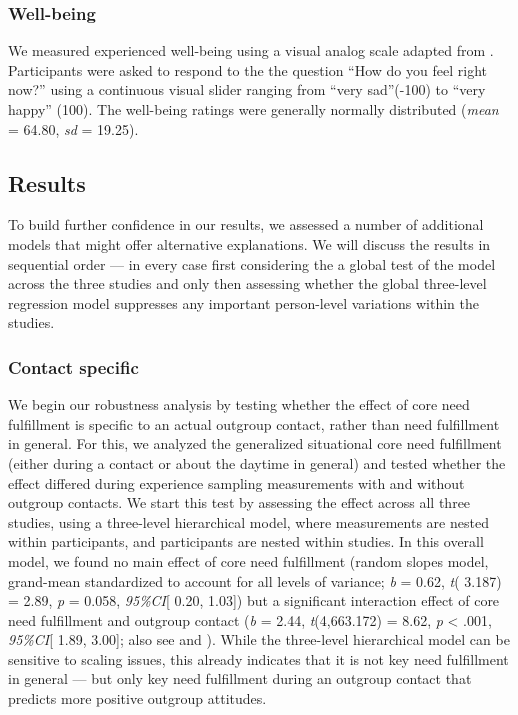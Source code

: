 \subsubsection{Well-being}

We measured experienced well-being using a visual analog scale adapted
from \citet{davies2022}. Participants were asked to respond to the the
question ``How do you feel right now?'' using a continuous visual slider
ranging from ``very sad''(-100) to ``very happy'' (100). The well-being
ratings were generally normally distributed (\textit{mean} = 64.80,
\textit{sd} = 19.25).

\subsection{Results}

To build further confidence in our results, we assessed a number of
additional models that might offer alternative explanations. We will
discuss the results in sequential order --- in every case first
considering the a global test of the model across the three studies and
only then assessing whether the global three-level regression model
suppresses any important person-level variations within the studies.

\subsubsection{Contact specific}

We begin our robustness analysis by testing whether the effect of core
need fulfillment is specific to an actual outgroup contact, rather than
need fulfillment in general. For this, we analyzed the generalized
situational core need fulfillment (either during a contact or about the
daytime in general) and tested whether the effect differed during
experience sampling measurements with and without outgroup contacts. We
start this test by assessing the effect across all three studies, using
a three-level hierarchical model, where measurements are nested within
participants, and participants are nested within studies. In this
overall model, we found no main effect of core need fulfillment (random
slopes model, grand-mean standardized to account for all levels of
variance; \textit{b} = 0.62, \textit{t}( 3.187) = 2.89, \textit{p} =
0.058, \textit{95\%CI}{[} 0.20, 1.03{]}) but a significant interaction
effect of core need fulfillment and outgroup contact (\textit{b} = 2.44,
\textit{t}(4,663.172) = 8.62, \textit{p} \textless{} .001,
\textit{95\%CI}{[} 1.89, 3.00{]}; also see
 and ). While the
three-level hierarchical model can be sensitive to scaling issues, this
already indicates that it is not key need fulfillment in general --- but
only key need fulfillment during an outgroup contact that predicts more
positive outgroup attitudes.

